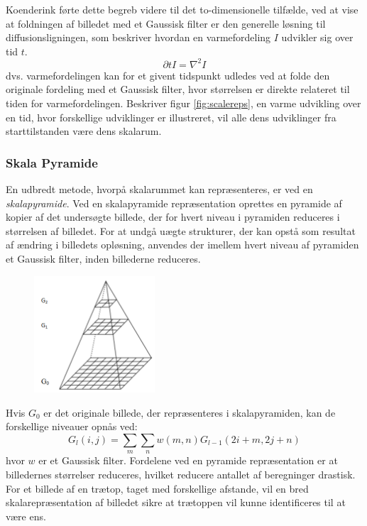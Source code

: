 Koenderink \cite{koen} førte dette begreb videre til det to-dimensionelle tilfælde, ved at vise at foldningen af billedet med et Gaussisk filter er den generelle løsning til diffusionsligningen, som beskriver hvordan en varmefordeling $I$ udvikler sig over tid $t$.
$$ \partial t I = \nabla^2I $$
dvs. varmefordelingen kan for et givent tidspunkt udledes ved at folde den originale fordeling med et Gaussisk filter, hvor størrelsen er direkte relateret til tiden for varmefordelingen. Beskriver figur \ref{fig:scalereps}, en varme udvikling over en tid, hvor forskellige udviklinger er illustreret, vil alle dens udviklinger fra starttilstanden være dens skalarum.
\subsubsection*{Skala Pyramide}
En udbredt metode, hvorpå skalarummet kan repræsenteres, er ved en \textit{skalapyramide}. Ved en skalapyramide repræsentation oprettes en pyramide af kopier af det undersøgte billede, der for hvert niveau i pyramiden reduceres i størrelsen af billedet. For at undgå uægte strukturer, der kan opstå som resultat af ændring i billedets opløsning, anvendes der imellem hvert niveau af pyramiden et Gaussisk filter, inden billederne reduceres. \begin{figure}[H]
    \centering
    \includegraphics[width=0.40\textwidth]{fig/40.png}
     \vspace{-1em}
    \begin{center}    
       \caption{\textcolor{gray}{\footnotesize \textit{ }}}
    \label{fig:scalerepdiff}
     \end{center}
     \vspace{-2.5em}
  \end{figure} \noindent
Hvis $G_0$ er det originale billede, der repræsenteres i skalapyramiden, kan de forskellige niveauer opnås ved:
\begin{equation}
G_l(i,j)=\sum\limits_{m}\sum\limits_{n}w(m,n)G_{l-1}(2i+m,2j+n)
\end{equation}
hvor $w$ er et Gaussisk filter. Fordelene ved en pyramide repræsentation er at billedernes størrelser reduceres, hvilket reducere antallet af beregninger drastisk. \\
For et billede af en trætop, taget med forskellige afstande, vil en bred skalarepræsentation af billedet sikre at trætoppen vil kunne identificeres til at være ens.
